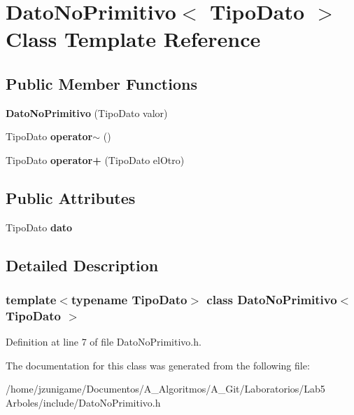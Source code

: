 \hypertarget{class_dato_no_primitivo}{}\section{Dato\+No\+Primitivo$<$ Tipo\+Dato $>$ Class Template Reference}
\label{class_dato_no_primitivo}
\subsection*{Public Member Functions}
\begin{DoxyCompactItemize}
\item 
\mbox{\label{class_dato_no_primitivo_a37b2ecf8202f6037efa21f0e340fa198}} 
{\bfseries Dato\+No\+Primitivo} (Tipo\+Dato valor)
\item 
\mbox{\label{class_dato_no_primitivo_ab2a2626f7e34079f90cd8a61f0f03840}} 
Tipo\+Dato {\bfseries operator$\sim$} ()
\item 
\mbox{\label{class_dato_no_primitivo_af9b4cdfe5ec277aa6af84fed97fb7663}} 
Tipo\+Dato {\bfseries operator+} (Tipo\+Dato el\+Otro)
\end{DoxyCompactItemize}
\subsection*{Public Attributes}
\begin{DoxyCompactItemize}
\item 
\mbox{\label{class_dato_no_primitivo_a7840fa6944a37abfe97b5417fbc5b445}} 
Tipo\+Dato {\bfseries dato}
\end{DoxyCompactItemize}


\subsection{Detailed Description}
\subsubsection*{template$<$typename Tipo\+Dato$>$\newline
class Dato\+No\+Primitivo$<$ Tipo\+Dato $>$}



Definition at line 7 of file Dato\+No\+Primitivo.\+h.



The documentation for this class was generated from the following file\+:\begin{DoxyCompactItemize}
\item 
/home/jzunigame/\+Documentos/\+A\+\_\+\+Algoritmos/\+A\+\_\+\+Git/\+Laboratorios/\+Lab5 Arboles/include/Dato\+No\+Primitivo.\+h\end{DoxyCompactItemize}
